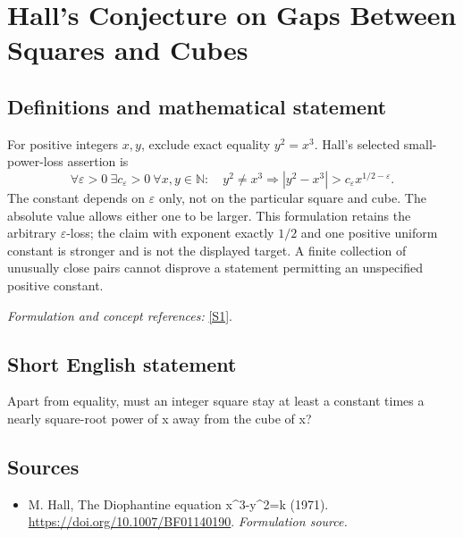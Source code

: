 \documentclass[11pt]{article}
\begin{document}
\section*{\texorpdfstring{Hall's Conjecture on Gaps Between Squares and Cubes}{Hall's Conjecture on Gaps Between Squares and Cubes}}\label{465}
\subsection{Definitions and mathematical statement}
For positive integers $x,y$, exclude exact equality $y^2=x^3$. Hall's selected small-power-loss assertion is
\[
 \forall{\varepsilon}>0\ \exists c_{\varepsilon}>0\ \forall x,y\in{\mathbb{N}}:\quad
 y^2\ne x^3\Longrightarrow
 |y^2-x^3|>c_{\varepsilon} x^{1/2-{\varepsilon}}.
\]
The constant depends on ${\varepsilon}$ only, not on the particular square and cube. The absolute value allows either one to be larger. This formulation retains the arbitrary ${\varepsilon}$-loss; the claim with exponent exactly $1/2$ and one positive uniform constant is stronger and is not the displayed target. A finite collection of unusually close pairs cannot disprove a statement permitting an unspecified positive constant.
\par\smallskip\textit{Formulation and concept references:} \href{https://doi.org/10.1007/BF01140190}{[S1]}.

\subsection{Short English statement}
Apart from equality, must an integer square stay at least a constant times a nearly square-root power of x away from the cube of x?
\subsection{Sources}
\begin{itemize}
\item[S1]M. Hall, The Diophantine equation x\textasciicircum{}3-y\textasciicircum{}2=k (1971).
\url{https://doi.org/10.1007/BF01140190}.
\textit{Formulation source.}
\end{itemize}
\end{document}
